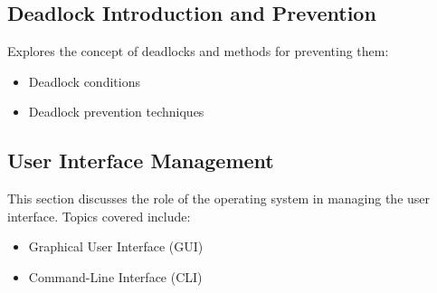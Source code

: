 \documentclass[12pt]{article}
\begin{document}
\subsection{Deadlock Introduction and Prevention}
Explores the concept of deadlocks and methods for preventing them:
\begin{itemize}
    \item Deadlock conditions
    \item Deadlock prevention techniques
\end{itemize}

\subsection{User Interface Management}
This section discusses the role of the operating system in managing the user interface. Topics covered include:
\begin{itemize}
    \item Graphical User Interface (GUI)
    \item Command-Line Interface (CLI)
\end{itemize}
\end{document}
